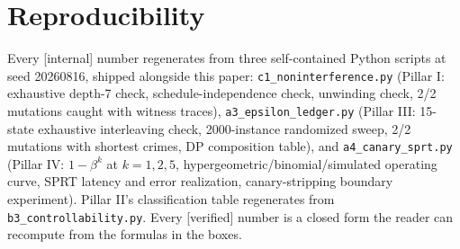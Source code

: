 \documentclass[11pt,a4paper]{article}
\begin{document}
\section*{Reproducibility}

Every [internal] number regenerates from three self-contained Python scripts at seed 20260816, shipped alongside this paper:
\texttt{c1\_noninterference.py} (Pillar I: exhaustive depth-7 check, schedule-independence check, unwinding check, 2/2 mutations
caught with witness traces), \texttt{a3\_epsilon\_ledger.py} (Pillar III: 15-state exhaustive interleaving check, 2000-instance
randomized sweep, 2/2 mutations with shortest crimes, DP composition table), and \texttt{a4\_canary\_sprt.py} (Pillar IV:
$1-\beta^k$ at $k{=}1,2,5$, hypergeometric/binomial/simulated operating curve, SPRT latency and error realization,
canary-stripping boundary experiment). Pillar II's classification table regenerates from \texttt{b3\_controllability.py}. Every
[verified] number is a closed form the reader can recompute from the formulas in the boxes.
\end{document}
